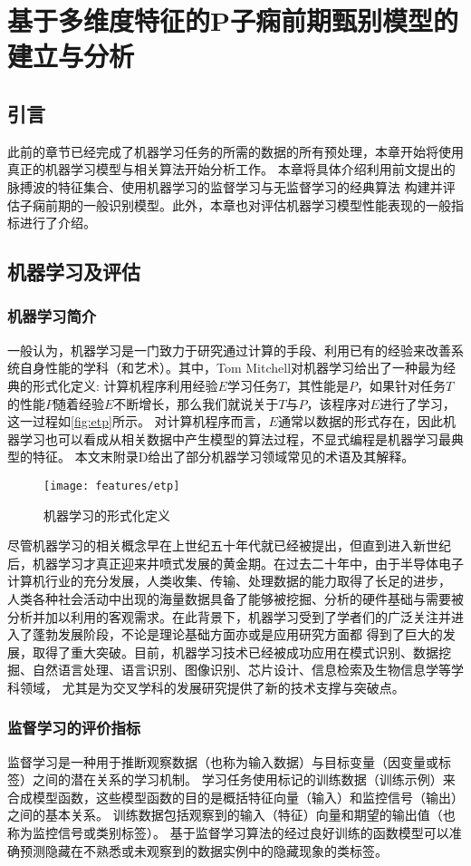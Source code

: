 \chapter{基于多维度特征的P子痫前期甄别模型的建立与分析}
\section{引言}
此前的章节已经完成了机器学习任务的所需的数据的所有预处理，本章开始将使用真正的机器学习模型与相关算法开始分析工作。
本章将具体介绍利用前文提出的脉搏波的特征集合、使用机器学习的监督学习与无监督学习的经典算法
构建并评估子痫前期的一般识别模型。此外，本章也对评估机器学习模型性能表现的一般指标进行了介绍。
\section{机器学习及评估}
\subsection{机器学习简介}
一般认为，机器学习是一门致力于研究通过计算的手段、利用已有的经验来改善系统自身性能的学科（和艺术）\cite{Zhou2016,Aurélien2018}。其中，Tom Mitchell对机器学习给出了一种最为经典的形式化定义:
计算机程序利用经验$E$学习任务$T$，其性能是$P$，如果针对任务$T$的性能$P$随着经验$E$不断增长，那么我们就说关于$T$与$P$，该程序对$E$进行了学习，这一过程如\autoref{fig:etp}所示\cite{mitchell1997,Zhou2016}。
对计算机程序而言，$E$通常以数据的形式存在，因此机器学习也可以看成从相关数据中产生模型的算法过程，不显式编程是机器学习最典型的特征。
本文末附录D给出了部分机器学习领域常见的术语及其解释。
\begin{figure}[htbp]
  \centering
  \texttt{[image: features/etp]}
  \caption[机器学习方法的形式化定义]{\label{fig:etp}机器学习的形式化定义}
\end{figure}
尽管机器学习的相关概念早在上世纪五十年代就已经被提出，但直到进入新世纪后，机器学习才真正迎来井喷式发展的黄金期。在过去二十年中，由于半导体电子计算机行业的充分发展，人类收集、传输、处理数据的能力取得了长足的进步，
人类各种社会活动中出现的海量数据具备了能够被挖掘、分析的硬件基础与需要被分析并加以利用的客观需求。在此背景下，机器学习受到了学者们的广泛关注并进入了蓬勃发展阶段，不论是理论基础方面亦或是应用研究方面都
得到了巨大的发展，取得了重大突破。目前，机器学习技术已经被成功应用在模式识别、数据挖掘、自然语言处理、语言识别、图像识别、芯片设计、信息检索及生物信息学等学科领域，
尤其是为交叉学科的发展研究提供了新的技术支撑与突破点\cite{Zhou2016,Aurélien2018,Li2017}。
\subsection{监督学习的评价指标}
监督学习是一种用于推断观察数据（也称为输入数据）与目标变量（因变量或标签）之间的潜在关系的学习机制。
学习任务使用标记的训练数据（训练示例）来合成模型函数，这些模型函数的目的是概括特征向量（输入）和监控信号（输出）之间的基本关系。
训练数据包括观察到的输入（特征）向量和期望的输出值（也称为监控信号或类别标签）。
基于监督学习算法的经过良好训练的函数模型可以准确预测隐藏在不熟悉或未观察到的数据实例中的隐藏现象的类标签。

